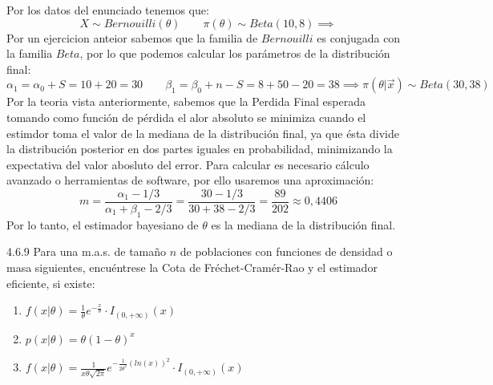 \begin{sol}
  Por los datos del enunciado tenemos que: 
  $$X \sim Bernouilli(\theta) \quad \quad \pi(\theta) \sim Beta(10, 8) \implies$$
  Por un ejercicion anteior sabemos que la familia de $Bernouilli$ es conjugada con la familia $Beta$, por lo que podemos calcular los parámetros de la distribución final:
  $$\alpha_1 = \alpha_0 + S = 10 + 20 = 30 \quad \quad \beta_1 = \beta_0 + n - S = 8 + 50 - 20 = 38 \implies \pi(\theta | \vec{x}) \sim Beta(30, 38)$$
  Por la teoria vista anteriormente, sabemos que la Perdida Final esperada tomando como función de pérdida el alor absoluto se minimiza cuando el estimdor toma el valor de la mediana de la distribución final, ya que ésta divide la distribución posterior en dos partes iguales en probabilidad, minimizando la expectativa del valor abosluto del error. Para calcular es necesario cálculo avanzado o herramientas de software, por ello usaremos una aproximación: 
  $$m = \frac{\alpha_1 - 1/3}{\alpha_1 + \beta_1 - 2/3} = \frac{30 - 1/3}{30 + 38 - 2/3} = \frac{89}{202} \approx 0,4406$$
  Por lo tanto, el estimador bayesiano de $\theta$ es la mediana de la distribución final.
\end{sol}

\begin{problem}{4.6.9}
  Para una m.a.s. de tamaño $n$ de poblaciones con funciones de densidad o masa siguientes, encuéntrese la Cota de Fréchet-Cramér-Rao y el estimador eficiente, si existe: 
  \begin{enumerate}
    \item $f(x | \theta) = \frac{1}{\theta} e^{-\frac{x}{\theta}}\cdot I_{(0, +\infty)}(x)$
    \item $p(x | \theta) = \theta(1 - \theta)^x$
    \item $f(x | \theta) = \frac{1}{x\theta\sqrt{2\pi}} e^{-\frac{1}{2\theta^2}(ln(x))^2}\cdot I_{(0, +\infty)}(x)$
  \end{enumerate}
\end{problem}

